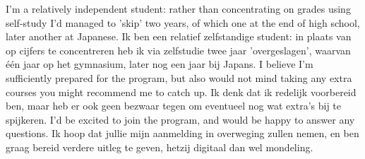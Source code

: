 \documentclass[11pt, a4paper]{awesome-cv}
\newcommand{\langen}[1]{\ifen#1\fi}
\newcommand{\langnl}[1]{\ifnl#1\fi}
\begin{document}
\begin{cvletter}
    \langen{I'm a relatively independent student:
    rather than concentrating on grades using self-study I'd managed to 'skip' two years, of which one at the end of high school, later another at Japanese.
    }\langnl{Ik ben een relatief zelfstandige student:
    in plaats van op cijfers te concentreren heb ik via zelfstudie twee jaar 'overgeslagen',
    waarvan één jaar op het gymnasium, later nog een jaar bij Japans.}
    \newline\newline
    \langen{I believe I'm sufficiently prepared for the program, but also would not mind taking any extra courses you might recommend me to catch up.
    }\langnl{Ik denk dat ik redelijk voorbereid ben, maar heb er ook geen bezwaar tegen om eventueel nog wat extra's bij te spijkeren.
    }
    \newline\newline
    \langen{I'd be excited to join the program,
    and would be happy to answer any questions.
    }\langnl{Ik hoop dat jullie mijn aanmelding in overweging zullen nemen,
    en ben graag bereid verdere uitleg te geven, hetzij digitaal dan wel mondeling.
    }
    
    \end{cvletter}
    \makeletterclosing
    
\end{document}
